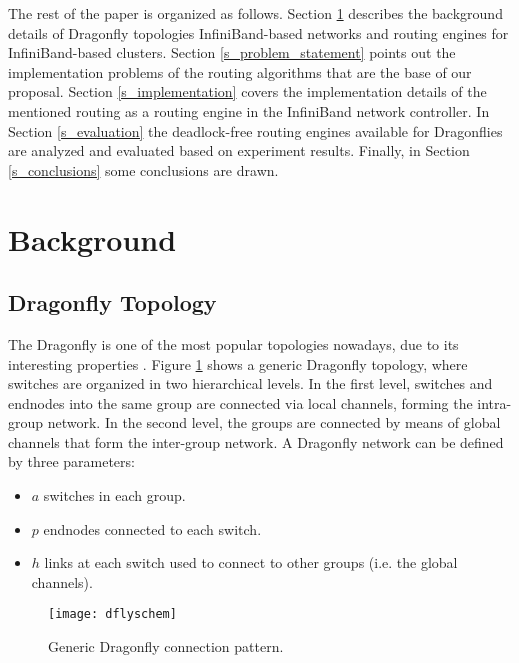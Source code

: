 \documentclass[review]{elsarticle}
\newcommand{\dflys}{Dragonflies}
\newcommand{\dfly}{Dragonfly}
\newcommand{\ibl}{InfiniBand}
\begin{document}
The rest of the paper is organized as follows.
Section \ref{s_background} describes the background details of \dfly{} topologies \ibl-based networks and routing engines for \ibl-based clusters.
Section \ref{s_problem_statement} points out the implementation problems of the routing algorithms that are the base of our proposal.
Section \ref{s_implementation} covers the implementation details of the mentioned routing as a routing engine in the \ibl{} network controller.
In Section \ref{s_evaluation} the deadlock-free routing engines available for \dflys{} are analyzed and evaluated based on experiment results.
Finally, in Section \ref{s_conclusions} some conclusions are drawn.

\section{Background}
\label{s_background}

\subsection{\dfly{} Topology}
\label{s_background_dfly}

The \dfly{} \cite{kim_technology-driven_2008} is one of the most popular topologies nowadays, due to its interesting properties \cite{camarero2014_hamm_dfly}.
Figure \ref{f:dflyschem} shows a generic \dfly{} topology, where switches are organized in two hierarchical levels.
In the first level, switches and endnodes into the same group are connected via local channels, forming the intra-group network.
In the second level, the groups are connected by means of global channels that form the inter-group network.
A \dfly{} network can be defined by three parameters:

\begin{itemize}
 \item $a$ switches in each group.
 \item $p$ endnodes connected to each switch.
 \item $h$ links at each switch used to connect to other groups (i.e. the global channels).
\end{itemize}

\begin{figure}[!htb]
	\centering
	\texttt{[image: dflyschem]}
	\caption{Generic \dfly{} connection pattern.}
	\label{f:dflyschem}
\end{figure}
\end{document}
